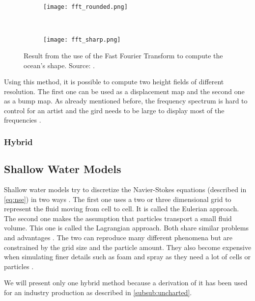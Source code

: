 \begin{figure}[ht!]
    \centering
    \begin{subfigure}[ht]{0.45\textwidth}
        \centering
        \texttt{[image: fft\_rounded.png]}
        \label{subfig:fft_round}
    \end{subfigure}~%
    \begin{subfigure}[ht]{0.45\textwidth}
        \centering
        \texttt{[image: fft\_sharp.png]}
        \label{subfig:fft_sharp}
    \end{subfigure}
    \caption{Result from the use of the Fast Fourier Transform to compute the
    ocean's shape. Source:
    \autocite{tessendorf2001simulating}.}\label{fig:fft_comparison}
\end{figure}

Using this method, it is possible to compute two height fields of different
resolution. The first one can be used as a displacement map and the second one
as a bump map. As already mentioned before, the frequency spectrum is hard to
control for an artist and the gird needs to be large to display most of the
frequencies \autocite{gonzalez2016rendering}.


\subsubsection{Hybrid}

\subsection{Shallow Water Models}\label{subsec:shallow_water}

Shallow water models try to discretize the Navier-Stokes equations (described in
\autoref{eq:nse}) in two ways \autocite{darles2011survey}. The first one uses a
two or three dimensional grid to represent the fluid moving from cell to cell.
It is called the Eulerian approach. The second one makes the assumption that
particles transport a small fluid volume. This one is called the Lagrangian
approach. Both share similar problems and advantages
\autocite{darles2011survey}. The two can reproduce many different phenomena but
are constrained by the grid size and the particle amount. They also become
expensive when simulating finer details such as foam and spray as they need a
lot of cells or particles \autocite{darles2011survey}.

We will present only one hybrid method because a derivation of it has been used
for an industry production as described in \cref{subsub:uncharted}.

